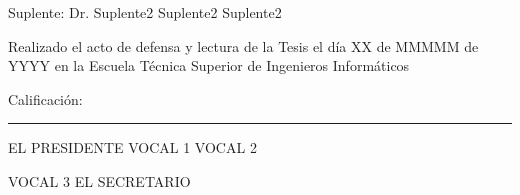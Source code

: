 \documentclass[twoside,11pt,table,xcdraw]{Latex/Classes/PhDthesisPSnPDF}
\begin{document}
\vspace{5mm}
Suplente: \hspace{1.5mm} Dr. Suplente2 Suplente2 Suplente2

\vspace{10mm}
\noindent Realizado el acto de defensa y lectura de la Tesis el d\'{i}a XX de MMMMM de YYYY en la Escuela T\'ecnica Superior de Ingenieros Inform\'aticos

\vspace{5mm}
\noindent Calificaci\'{o}n: \rule{123mm}{0.2mm}
\vspace{20mm}

EL PRESIDENTE \hspace{30mm} VOCAL 1 \hspace{30mm} VOCAL 2

\vspace{30mm}
\hspace{15mm} VOCAL 3 \hspace{45mm} EL SECRETARIO





\cleardoublepage

\cleardoublepage




\cleardoublepage


%   


\cleardoublepage
\setcounter{secnumdepth}{3} %
\setcounter{tocdepth}{2}    %
\tableofcontents           %
\end{document}
